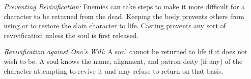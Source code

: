 \textit{Preventing Revivification:} Enemies can take steps to make it more difficult for a character to be returned from the dead. Keeping the body prevents others from using  or  to restore the slain character to life. Casting  prevents any sort of revivification unless the soul is first released.

\textit{Revivification against One's Will:} A soul cannot be returned to life if it does not wish to be. A soul knows the name, alignment, and patron deity (if any) of the character attempting to revive it and may refuse to return on that basis.

